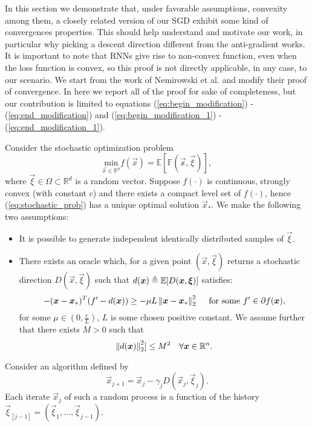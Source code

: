 In this section we demonstrate that, under favorable assumptions, convexity among them, a closely related version of our SGD exhibit some kind of convergences properties. This should help understand and motivate our work, in particular why picking a descent direction different from the anti-gradient works. It is important to note that RNNs give rise to non-convex function, even when the loss function is convex, so this proof is not directly applicable, in any case, to our scenario.  We start from the work of Nemirowski et al.\cite{Nemirovski} and modify their proof of convergence. In here we report all of the proof for sake of completeness, but our contribution is limited to equations (\ref{eq:begin_modification}) - (\ref{eq:end_modification}) and (\ref{eq:begin_modification_1}) - (\ref{eq:end_modification_1}).

Consider the stochastic optimization problem 
\begin{equation}
\underset{\vec{x} \in \mathbb{R}^n}{\text{min}} f(\vec{x}) = \mathbb{E[F(\vec{x}, \vec{\xi})]},
\label{eq:stochastic_prob}
\end{equation}
where $\vec{\xi} \in \Omega \subset \mathbb{R}^d$ is a random vector.
Suppose $f(\cdot)$ is continuous, strongly convex (with constant $c$) and there exists a compact level set of $f(\cdot)$, hence (\ref{eq:stochastic_prob}) has a unique optimal solution $\vec{x}_*$. We make the following two assumptions:
\begin{itemize}
	\item	It is possible to generate independent identically distributed samples of $\vec{\xi}$.
	\item There exists an oracle which, for a given point $(\vec{x}, \vec{\xi})$ returns a stochastic direction $D(\vec{x}, \vec{\xi})$ such that $d(\boldsymbol{x})\triangleq\mathbb{E}[D(\boldsymbol{x}, \boldsymbol{\xi})]$ satisfies:
	\begin{equation}
	-(\boldsymbol{x}-\boldsymbol{x}_*)^T (f^{\prime} -d(\boldsymbol{x})) \geq -\mu L \left\Vert \boldsymbol{x}-\boldsymbol{x}_* \right\Vert^2_2\quad \text{ for some } f^\prime \in \partial f(\boldsymbol{x}),
	\label{eq:angular_condition}
	\end{equation}
	for some $\mu \in (0,\frac{c}{L}) $, $L$ is some chosen positive constant. We assume further that there exists $M>0$ such that
	\begin{equation}
	\left\Vert d(\boldsymbol{x}) \right\Vert^2_2]\leq M^2 \quad \forall \boldsymbol{x} \in \mathbb{R}^n.
	\label{eq:gradient_bound}
	\end{equation}
\end{itemize}
Consider an algorithm defined by
\begin{equation}
\vec{x}_{j+1} = \vec{x}_j -\gamma_j D(\vec{x}_j,\vec{\xi}_j).
\label{eq:stochastic_algo}
\end{equation}
Each iterate $\vec{x}_j$ of such a random process is a function of the history $\vec{\xi}_{[j-1]}=(\vec{\xi}_1,\dots, \vec{\xi}_{j-1})$.


